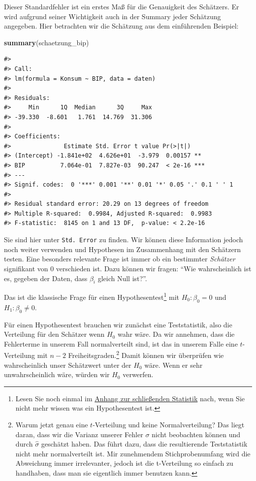 \documentclass[]{book}
\newenvironment{Shaded}{\begin{snugshade}}{\end{snugshade}}
\newcommand{\KeywordTok}[1]{\textcolor[rgb]{0.13,0.29,0.53}{\textbf{#1}}}
\newcommand{\NormalTok}[1]{#1}
\let\rmarkdownfootnote\footnote%
\def\footnote{\protect\rmarkdownfootnote}
\begin{document}
Dieser Standardfehler ist ein erstes Maß für die Genauigkeit des
Schätzers. Er wird aufgrund seiner Wichtigkeit auch in der Summary jeder
Schätzung angegeben. Hier betrachten wir die Schätzung aus dem
einführenden Beispiel:

\begin{Shaded}
\begin{Highlighting}[]
\KeywordTok{summary}\NormalTok{(schaetzung_bip)}
\end{Highlighting}
\end{Shaded}

\begin{verbatim}
#> 
#> Call:
#> lm(formula = Konsum ~ BIP, data = daten)
#> 
#> Residuals:
#>     Min      1Q  Median      3Q     Max 
#> -39.330  -8.601   1.761  14.769  31.306 
#> 
#> Coefficients:
#>               Estimate Std. Error t value Pr(>|t|)    
#> (Intercept) -1.841e+02  4.626e+01  -3.979  0.00157 ** 
#> BIP          7.064e-01  7.827e-03  90.247  < 2e-16 ***
#> ---
#> Signif. codes:  0 '***' 0.001 '**' 0.01 '*' 0.05 '.' 0.1 ' ' 1
#> 
#> Residual standard error: 20.29 on 13 degrees of freedom
#> Multiple R-squared:  0.9984, Adjusted R-squared:  0.9983 
#> F-statistic:  8145 on 1 and 13 DF,  p-value: < 2.2e-16
\end{verbatim}

Sie sind hier unter \texttt{Std.\ Error} zu finden. Wir können diese
Information jedoch noch weiter verwenden und Hypothesen im Zusammenhang
mit den Schätzern testen. Eine besonders relevante Frage ist immer ob
ein bestimmter \emph{Schätzer} signifikant von 0 verschieden ist. Dazu
können wir fragen: ``Wie wahrscheinlich ist es, gegeben der Daten, dass
\(\beta_i\) gleich Null ist?''.

Das ist die klassische Frage für einen Hypothesentest\footnote{Lesen Sie
  noch einmal im \protect\hyperlink{stat-rep}{Anhang zur schließenden
  Statistik} nach, wenn Sie nicht mehr wissen was ein Hypothesentest
  ist.} mit \(H_0: \beta_0=0\) und \(H_1: \beta_0 \neq 0\).

Für einen Hypothesentest brauchen wir zunächst eine Teststatistik, also
die Verteilung für den Schätzer wenn \(H_0\) wahr wäre. Da wir annehmen,
dass die Fehlerterme in unserem Fall normalverteilt sind, ist das in
unserem Falle eine \(t\)-Verteilung mit \(n-2\)
Freiheitsgraden.\footnote{Warum jetzt genau eine \(t\)-Verteilung und
  keine Normalverteilung? Das liegt daran, dass wir die Varianz unserer
  Fehler \(\sigma\) nicht beobachten können und durch \(\hat{\sigma}\)
  geschätzt haben. Das führt dazu, dass die resultierende Teststatistik
  nicht mehr normalverteilt ist. Mir zunehmendem Stichprobenumfang wird
  die Abweichung immer irrelevanter, jedoch ist die t-Verteilung so
  einfach zu handhaben, dass man sie eigentlich immer benutzen kann.}
Damit können wir überprüfen wie wahrscheinlich unser Schätzwert unter
der \(H_0\) wäre. Wenn er sehr unwahrscheinlich wäre, würden wir \(H_0\)
verwerfen.
\end{document}
